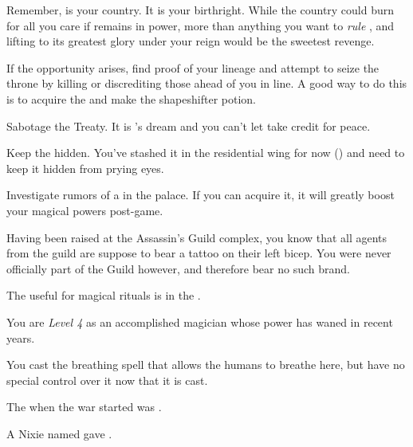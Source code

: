 \documentclass[char]{NeptuneBall}
\begin{document}
Remember, \pAtlantis{} is your country. It is your birthright. While the country could burn for all you care if \cKing{} remains in power, more than anything you want to \emph{rule} \pAtlantis{}, and lifting \pAtlantis{} to its greatest glory under your reign would be the sweetest revenge.

\begin{itemz}[Goals]
  \item If the opportunity arises, find proof of your lineage and attempt to seize the throne by killing or discrediting those ahead of you in line. A good way to do this is to acquire the \iHemlock{} and make the shapeshifter potion.
  \item Sabotage the Treaty. It is \cKing{}'s dream and you can't let \cKing{\them} take credit for peace.
  \item Keep the \iMusicBox{} hidden. You've stashed it in the residential wing for now (\sPacketA{\MYloc}) and need to keep it hidden from prying eyes.
  \item Investigate rumors of a \iGlowShell{} in the palace. If you can acquire it, it will greatly boost your magical powers post-game.
\end{itemz}

\begin{itemz}[Notes]
  \item Having been raised at the Assassin's Guild complex, you know that all agents from the guild are suppose to bear a tattoo on their left bicep. You were never officially part of the Guild however, and therefore bear no such brand.
	\item The \sRunicCircle{} useful for magical rituals is in the \pCaves{\MYname}.
	\item You are \emph{Level 4} as an accomplished magician whose power has waned in recent years.
  \item You cast the breathing spell that allows the humans to breathe here, but have no special control over it now that it is cast.
\end{itemz}

\begin{itemz}[Trivia]
  \item The \cExExKing{\King} when the war started was \cExExKing{}.
	\item A Nixie named \cNixie{} gave \cExKing{} \iTrident{\MYname}.
\end{itemz}
\end{document}
